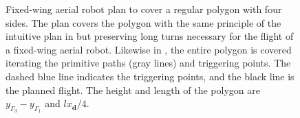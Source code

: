 \begin{figure}[p!]
  \centering
  
  \caption[Fixed-wing aerial robot's plan to cover a regular polygon with four sides]{Fixed-wing aerial robot plan to cover a regular polygon with four sides. The plan covers the polygon with the same principle of the intuitive plan in  but preserving long turns necessary for the flight of a fixed-wing aerial robot. Likewise in , the entire polygon is covered iterating the primitive paths (gray lines) and triggering points. The dashed blue line indicates the triggering points, and the black line is the planned flight. The height and length of the polygon are $y_{\Gamma_3}-y_{\Gamma_1}$ and $lx_\mathbf{d}/4$.}
  \label{fig:plot4}
\end{figure}

